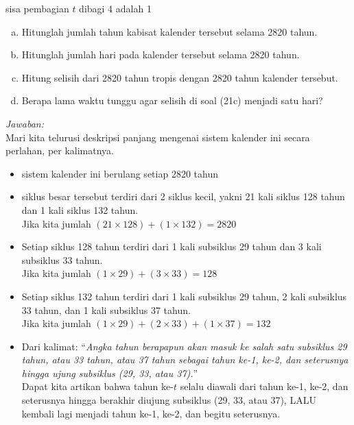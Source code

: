 \documentclass[11pt,fleqn]{exam}
\begin{document}
\begin{questions}
\begin{center}
sisa pembagian $t$ dibagi 4 adalah 1\\
\end{center}

\begin{enumerate}[(a)]
\item Hitunglah jumlah tahun kabisat kalender tersebut selama 2820 tahun.
\item Hitunglah jumlah hari pada kalender tersebut selama 2820 tahun.
\item Hitung selisih dari 2820 tahun tropis dengan 2820 tahun kalender tersebut.
\item Berapa lama waktu tunggu agar selisih di soal (21c) menjadi satu hari? \\
\end{enumerate}


\textit{Jawaban: } \\

Mari kita telurusi deskripsi panjang mengenai sistem kalender ini secara perlahan,  per kalimatnya.
\begin{itemize}
\item sistem kalender ini berulang setiap 2820 tahun
\item siklus besar tersebut terdiri dari 2 siklus kecil, yakni 21 kali siklus 128 tahun dan 1 kali siklus 132 tahun. \\
Jika kita jumlah $(21 \times 128) + (1 \times 132) = 2820$ \checkmark
\item Setiap siklus 128 tahun terdiri dari 1 kali subsiklus 29 tahun dan 3 kali subsiklus 33 tahun. \\
Jika kita jumlah  $(1 \times 29) + (3 \times 33) = 128$ \checkmark
\item Setiap siklus 132 tahun terdiri dari 1 kali subsiklus 29 tahun, 2 kali subsiklus 33 tahun, dan 1 kali subsiklus 37 tahun. \\
Jika kita jumlah  $(1 \times 29) + (2 \times 33) + (1 \times 37) = 132$ \checkmark
\item Dari kalimat: ``\textit{Angka tahun berapapun akan masuk ke salah satu subsiklus 29 tahun, atau 33 tahun, atau 37 tahun sebagai tahun ke-1, ke-2, dan seterusnya hingga ujung subsiklus (29, 33, atau 37).}'' \\
Dapat kita artikan bahwa tahun ke-$t$ selalu diawali dari tahun ke-1, ke-2, dan seterusnya hingga berakhir diujung subsiklus (29, 33, atau 37), LALU kembali lagi menjadi tahun ke-1, ke-2, dan begitu seterusnya.


\end{itemize}
\end{questions}
\end{document}
